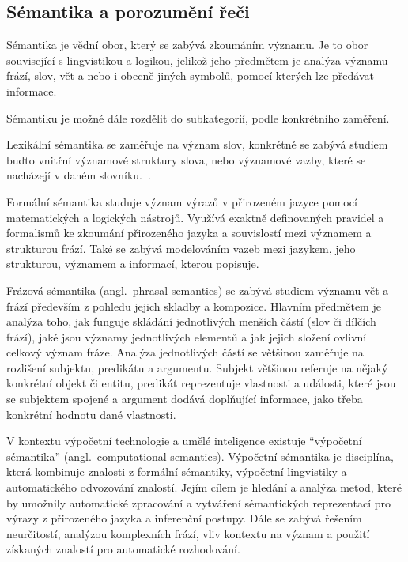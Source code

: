\subsection{Sémantika a porozumění řeči}
Sémantika je vědní obor, který se zabývá zkoumáním významu.
Je to obor související s lingvistikou a logikou, jelikož jeho předmětem je analýza významu frází, slov, vět a nebo i obecně jiných symbolů,
pomocí kterých lze předávat informace.~\cite{palmer1981semantics}

Sémantiku je možné dále rozdělit do subkategorií, podle konkrétního zaměření.

Lexikální sémantika se zaměřuje na význam slov, konkrétně se zabývá studiem buďto vnitřní významové struktury slova,
nebo významové vazby, které se nacházejí v daném slovníku.~\cite{lexical-semantics}.

Formální sémantika studuje význam výrazů v přirozeném jazyce pomocí matematických a logických nástrojů.
Využívá exaktně definovaných pravidel a formalismů ke zkoumání přirozeného jazyka a souvislostí mezi významem a strukturou frází.
Také se zabývá modelováním vazeb mezi jazykem, jeho strukturou, významem a informací, kterou popisuje.~\cite{rajman2007speech}~\cite{portner2008formal}

Frázová sémantika (angl.~phrasal semantics) se zabývá studiem významu vět a frází především z pohledu jejich skladby a kompozice.
Hlavním předmětem je analýza toho, jak funguje skládání jednotlivých menších částí (slov či dílčích frází),
jaké jsou významy jednotlivých elementů a jak jejich složení ovlivní celkový význam fráze.\cite{riemer2010introducing-semantic}
Analýza jednotlivých částí se většinou zaměřuje na rozlišení subjektu, predikátu a argumentu.
Subjekt většinou referuje na nějaký konkrétní objekt či entitu, predikát reprezentuje vlastnosti a události, které jsou se subjektem spojené
a argument dodává doplňující informace, jako třeba konkrétní hodnotu dané vlastnosti.~\cite{fasold2006introduction}

V kontextu výpočetní technologie a umělé inteligence existuje \enquote{výpočetní sémantika} (angl.~computational semantics).
Výpočetní sémantika je disciplína, která kombinuje znalosti z formální sémantiky, výpočetní lingvistiky a automatického odvozování znalostí.
Jejím cílem je hledání a analýza metod, které by umožnily automatické zpracování a vytváření sémantických reprezentací pro výrazy z přirozeného jazyka a inferenční postupy.
Dále se zabývá řešením neurčitostí, analýzou komplexních frází,
vliv kontextu na význam a použití získaných znalostí pro automatické rozhodování.~\cite{computational-semantics-blackburn-bos}~\cite{computation-semantics}

